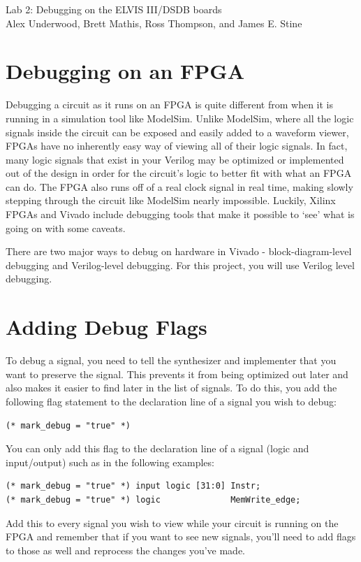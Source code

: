 \documentclass{article}
\newcommand{\myassignment}{Lab 2: Debugging on the ELVIS III/DSDB boards}
\newcommand{\myinstructor}{Alex Underwood, Brett Mathis, Ross Thompson, and James E. Stine}
\begin{document}
\graphicspath{{.}{./latex_graphics/}}
\begin{center}
  {\huge \myassignment} \\
  \myinstructor \\
\end{center}

\section{Debugging on an FPGA}
Debugging a circuit as it runs on an FPGA is quite different from when
it is running in a simulation tool like ModelSim.  Unlike ModelSim,
where all the logic signals inside the circuit can be exposed and
easily added to a waveform viewer, FPGAs have no inherently easy way
of viewing all of their logic signals.  In fact, many logic signals
that exist in your Verilog may be optimized or implemented out of the
design in order for the circuit's logic to better fit with what an
FPGA can do.  The FPGA also runs off of a real clock signal in real
time, making slowly stepping through the circuit like ModelSim nearly
impossible.  Luckily, Xilinx FPGAs and Vivado include debugging tools
that make it possible to `see' what is going on with some caveats.

There are two major ways to debug on hardware in Vivado -
block-diagram-level debugging and Verilog-level debugging.  For this
project, you will use Verilog level debugging.

\section{Adding Debug Flags}
To debug a signal, you need to tell the synthesizer and implementer
that you want to preserve the signal.  This prevents it from being
optimized out later and also makes it easier to find later in the list
of signals.  To do this, you add the following flag statement to the
declaration line of a signal you wish to debug:
\begin{verbatim}
(* mark_debug = "true" *)
\end{verbatim}
You can only add this flag to the declaration line of a signal
(logic and input/output) such as in the following examples:
\begin{verbatim}
(* mark_debug = "true" *) input logic [31:0] Instr;
(* mark_debug = "true" *) logic              MemWrite_edge;
\end{verbatim}
	
Add this to every signal you wish to view while your circuit is
running on the FPGA and remember that if you want to see new signals,
you'll need to add flags to those as well and reprocess the changes
you've made.
	
\end{document}
